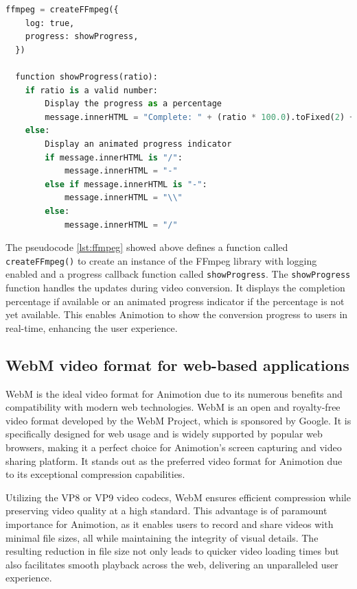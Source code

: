 \begin{lstlisting}[language=Python,caption=Showing the progress of conversion,label=lst:ffmpeg]
  ffmpeg = createFFmpeg({
    log: true,
    progress: showProgress,
  })

  function showProgress(ratio):
    if ratio is a valid number:
        Display the progress as a percentage
        message.innerHTML = "Complete: " + (ratio * 100.0).toFixed(2) + "%"
    else:
        Display an animated progress indicator
        if message.innerHTML is "/":
            message.innerHTML = "-"
        else if message.innerHTML is "-":
            message.innerHTML = "\\"
        else:
            message.innerHTML = "/"
\end{lstlisting}

The pseudocode \ref{lst:ffmpeg} showed above defines a function called \texttt{createFFmpeg()} 
to create an instance of the FFmpeg library with logging enabled and a progress callback function called \texttt{showProgress}.
The \texttt{showProgress} function handles the updates during video conversion. It displays the completion percentage if 
available or an animated progress indicator if the percentage is not yet available. This enables Animotion to show the 
conversion progress to users in real-time, enhancing the user experience.

\subsection{WebM video format for web-based applications}
WebM is the ideal video format for Animotion due to its numerous benefits and compatibility with modern web technologies. 
WebM is an open and royalty-free video format developed by the WebM Project, which is sponsored by Google. It is specifically 
designed for web usage and is widely supported by popular web browsers, making it a perfect choice for Animotion's screen 
capturing and video sharing platform. It stands out as the preferred video format 
for Animotion due to its exceptional compression capabilities. 

Utilizing the VP8 or VP9 video codecs, WebM ensures efficient compression while preserving 
video quality at a high standard. This advantage is of paramount importance for Animotion, 
as it enables users to record and share videos with minimal file sizes, all while maintaining the integrity of visual details. 
The resulting reduction in file size not only leads to quicker video loading times but also facilitates smooth 
playback across the web, delivering an unparalleled user experience.

